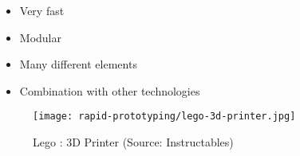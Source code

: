 \begin{frame}
    \begin{itemize}
        \item Very fast
        \item Modular
        \item Many different elements
        \item Combination with other technologies
    \end{itemize}
    \begin{figure}
        \texttt{[image: rapid-prototyping/lego-3d-printer.jpg]}
        \caption{Lego \texttrademark: 3D Printer (Source: Instructables)}
    \end{figure}
\end{frame}